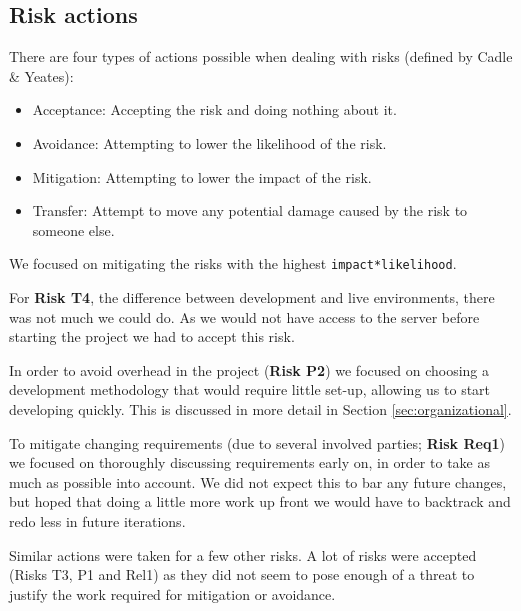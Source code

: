 \subsection{Risk actions}
There are four types of actions possible when dealing with risks (defined by Cadle \& Yeates):

\begin{itemize}
    \item Acceptance: Accepting the risk and doing nothing about it.
    \item Avoidance: Attempting to lower the likelihood of the risk.
    \item Mitigation: Attempting to lower the impact of the risk.
    \item Transfer: Attempt to move any potential damage caused by the risk to someone else.
\end{itemize}

We focused on mitigating the risks with the highest \verb+impact*likelihood+.

For \textbf{Risk T4}, the difference between development and live environments, there was not much we could
do. As we would not have access to the server before starting the project we had to accept this risk.

In order to avoid overhead in the project (\textbf{Risk P2}) we focused on choosing a development
methodology that would require little set-up, allowing us to start developing quickly. This is discussed in
more detail in Section \ref{sec:organizational}.

To mitigate changing requirements (due to several involved parties; \textbf{Risk Req1}) we focused on
thoroughly discussing requirements early on, in order to take as much as possible into account. We did not
expect this to bar any future changes, but hoped that doing a little more work up front we would have to
backtrack and redo less in future iterations.

Similar actions were taken for a few other risks. A lot of risks were accepted (Risks T3, P1 and Rel1) as
they did not seem to pose enough of a threat to justify the work required for mitigation or avoidance.